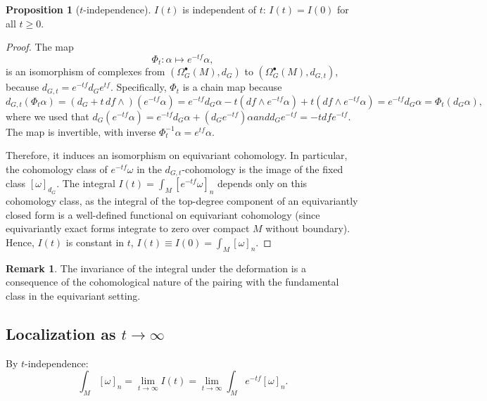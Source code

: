 \documentclass[10pt]{article}
\theoremstyle{definition}
\newtheorem{proposition}[definition]{Proposition}
\newtheorem{remark}[definition]{Remark}
\begin{document}
\begin{proposition}[$t$-independence]
$I(t)$ is independent of $t$: $I(t) = I(0)$ for all $t \ge 0$.
\end{proposition}
\begin{proof}
The map
\begin{equation}
\Phi_t: \alpha \mapsto e^{-tf} \alpha,
\end{equation}
is an isomorphism of complexes from $(\Omega_G^\bullet(M), d_G)$ to $(\Omega_G^\bullet(M), d_{G,t})$, because $d_{G,t} = e^{-tf} d_G e^{tf}$. Specifically, $\Phi_t$ is a chain map because
\begin{equation}
d_{G,t} (\Phi_t \alpha) = (d_G + t \, df \wedge) (e^{-tf} \alpha) = e^{-tf} d_G \alpha - t (df \wedge e^{-tf} \alpha) + t (df \wedge e^{-tf} \alpha) = e^{-tf} d_G \alpha = \Phi_t (d_G \alpha),
\end{equation}
where we used that $d_G (e^{-tf} \alpha) = e^{-tf} d_G \alpha + (d_G e^{-tf}) \alpha and d_G e^{-tf} = -t df e^{-tf}$. The map is invertible, with inverse $\Phi_t^{-1} \alpha = e^{tf} \alpha$.

Therefore, it induces an isomorphism on equivariant cohomology. In particular, the cohomology class of $e^{-tf} \omega$ in the $d_{G,t}$-cohomology is the image of the fixed class $[\omega]_{d_G}$. The integral $I(t) = \int_M [e^{-tf} \omega]_n$ depends only on this cohomology class, as the integral of the top-degree component of an equivariantly closed form is a well-defined functional on equivariant cohomology (since equivariantly exact forms integrate to zero over compact $M$ without boundary). Hence, $I(t)$ is constant in $t$, $I(t) \equiv I(0) = \int_M [\omega]_n$.
\end{proof}

\begin{remark}
The invariance of the integral under the deformation is a consequence of the cohomological nature of the pairing with the fundamental class in the equivariant setting.
\end{remark}

\subsection{Localization as $t \to \infty$}\label{subsec:localization-limit}
By $t$-independence:
\begin{equation}\label{eq:localization-limit}
    \int_{M} [\omega]_n = \lim_{t\to\infty} I(t) = \lim_{t\to\infty} \int_{M} e^{-tf} [\omega]_n.
\end{equation}
\end{document}
